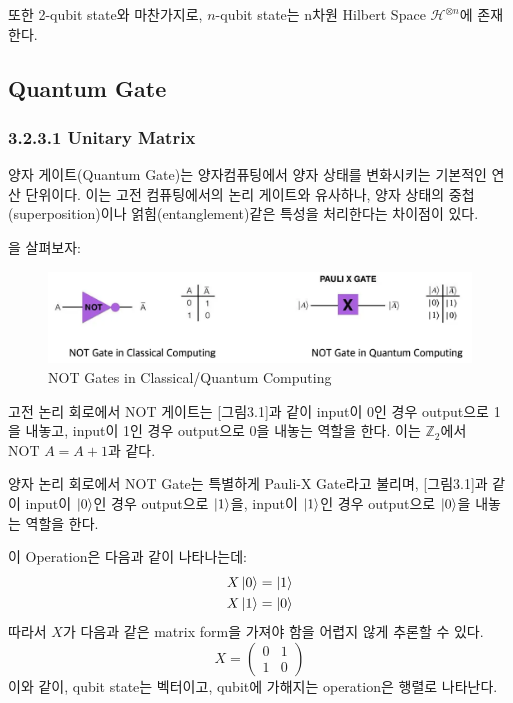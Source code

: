 \noindent 또한 2-qubit state와 마찬가지로, \(n\)-qubit state는 n차원 Hilbert Space \(\mathcal{H}^{\otimes n}\)에 존재한다.

\subsection{Quantum Gate}
\subsubsection{3.2.3.1 \quad Unitary Matrix}
양자 게이트(Quantum Gate)는 양자컴퓨팅에서 양자 상태를 변화시키는 기본적인 연산 단위이다. 이는 고전 컴퓨팅에서의 논리 게이트와 유사하나, 양자 상태의 중첩(superposition)이나 얽힘(entanglement)같은 특성을 처리한다는 차이점이 있다.

\noindent [그림 3.1]을 살펴보자:

\begin{figure}[htb!]
    \centering
    \includegraphics[width=0.8\linewidth]{figs/Not Gates.png}
    \caption{NOT Gates in Classical/Quantum Computing}
    \label{fig:NOT-Gates}
\end{figure}

고전 논리 회로에서 NOT 게이트는 [그림3.1]과 같이 input이 0인 경우 output으로 1을 내놓고, input이 1인 경우 output으로 0을 내놓는 역할을 한다. 이는 \(\mathbb{Z}_2\)에서 \( \text{NOT } A = A + 1\)과 같다.

양자 논리 회로에서 NOT Gate는 특별하게 Pauli-X Gate라고 불리며, [그림3.1]과 같이 input이 \(\ket 0\)인 경우 output으로 \(\ket 1\)을, input이 \(\ket 1\)인 경우 output으로 \(\ket 0\)을 내놓는 역할을 한다.

이 Operation은 다음과 같이 나타나는데:
\begin{align*}
    X\ket{0} &= \ket{1}  \\
    X\ket{1} &= \ket{0}
\end{align*}
따라서 \(X\)가 다음과 같은 matrix form을 가져야 함을 어렵지 않게 추론할 수 있다.
\[
    X = \begin{pmatrix}
        0 & 1 \\
        1 & 0
    \end{pmatrix}
\]
이와 같이, qubit state는 벡터이고, qubit에 가해지는 operation은 행렬로 나타난다.

